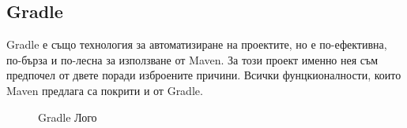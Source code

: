    \subsection{Gradle}
    Gradle е също технология за автоматизиране на проектите, но е по-ефективна, по-бърза и по-лесна за използване от Maven. За този проект именно нея съм предпочел от двете поради изброените причини. Всички фунцкионалности, които Maven предлага са покрити и от Gradle.
    
    \begin{figure}[h]
    \centering
    \caption{Gradle Лого}
    \label{fig:gradle}
\end{figure}


